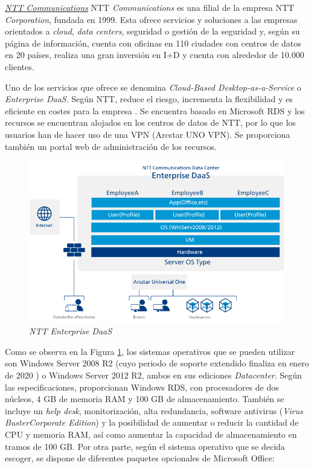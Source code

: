\noindent\underline{\textit{\acf{NTT} Communications}}\newline
\indent \acs{NTT} \textit{Communications} es una filial de la empresa \acs{NTT} \textit{Corporation}, fundada en 1999. Esta ofrece servicios y soluciones a las empresas orientados a \textit{cloud}, \textit{data centers}, seguridad o gestión de la seguridad \cite{nttcommunications} y, según su página de información, cuenta con oficinas en 110 ciudades con centros de datos en 20 países, realiza una gran inversión en I+D y cuenta con alrededor de 10.000 clientes.

\clearpage

Uno de los servicios que ofrece se denomina \textit{Cloud-Based Desktop-as-a-Service} o \textit{Enterprise \acs{DaaS}}. Según \acs{NTT}, reduce el riesgo, incrementa la flexibilidad y es eficiente en costes para la empresa \cite{nttdaas}. Se encuentra basado en Microsoft \acs{RDS} y los recursos se encuentran alojados en los centros de datos de \acs{NTT}, por lo que los usuarios han de hacer uso de una \acs{VPN} (Arcstar UNO VPN). Se proporciona también un portal web de administración de los recursos.
 
\begin{figure}[h]
    \centering
    \includegraphics[width=0.8\linewidth]{figures/images/ntt_daas.png}
    \caption{\textit{\acs{NTT} Enterprise \acs{DaaS}}}
    \label{fig:ntt_daas}
\end{figure}

Como se observa en la Figura \ref{fig:ntt_daas}, los sistemas operativos que se pueden utilizar son Windows Server 2008 R2 (cuyo periodo de soporte extendido finaliza en enero de 2020 \cite{microsoftwserver2008}) o Windows Server 2012 R2, ambos en sus ediciones \textit{Datacenter}. Según las especificaciones, proporcionan Windows \acs{RDS}, con procesadores de dos núcleos, 4 \acs{GB} de memoria \acs{RAM} y 100 \acs{GB} de almacenamiento. También se incluye un \textit{help desk}, monitorización, alta redundancia, software antivirus (\textit{Virus Buster\texttrademark Corporate Edition}) y la posibilidad de aumentar o reducir la cantidad de \acs{CPU} y memoria \acs{RAM}, así como aumentar la capacidad de almacenamiento en tramos de 100 \acs{GB}. Por otra parte, según el sistema operativo que se decida escoger, se dispone de diferentes paquetes opcionales de Microsoft Office:

